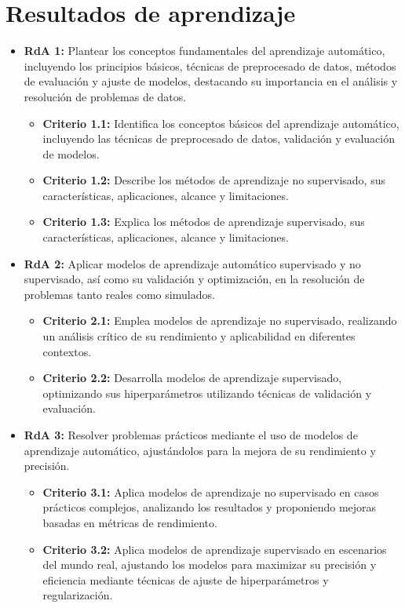 \documentclass[a4,11pt]{aleph-notas}
\begin{document}
\addtolength{\headheight}{1.8\baselineskip}
\addtolength{\voffset}{-1.5\baselineskip}

\encabezado

\section{Resultados de aprendizaje}

\begin{itemize}[leftmargin=*]
\item
    \textbf{RdA 1:} Plantear los conceptos fundamentales del aprendizaje automático, incluyendo los principios básicos, técnicas de preprocesado de datos, métodos de evaluación y ajuste de modelos, destacando su importancia en el análisis y resolución de problemas de datos.
    \begin{itemize}[leftmargin=*]
        \item \textbf{Criterio 1.1:} Identifica los conceptos básicos del aprendizaje automático, incluyendo las técnicas de preprocesado de datos, validación y evaluación de modelos.
        \item \textbf{Criterio 1.2:} Describe los métodos de aprendizaje no supervisado, sus características, aplicaciones, alcance y limitaciones.
        \item \textbf{Criterio 1.3:} Explica los métodos de aprendizaje supervisado, sus características, aplicaciones, alcance y limitaciones.
    \end{itemize}
\item
    \textbf{RdA 2:} Aplicar modelos de aprendizaje automático supervisado y no supervisado, así como su validación y optimización, en la resolución de problemas tanto reales como simulados.
    \begin{itemize}[leftmargin=*]
        \item \textbf{Criterio 2.1:} Emplea modelos de aprendizaje no supervisado, realizando un análisis crítico de su rendimiento y aplicabilidad en diferentes contextos.
        \item \textbf{Criterio 2.2:} Desarrolla modelos de aprendizaje supervisado, optimizando sus hiperparámetros utilizando técnicas de validación y evaluación.
    \end{itemize}
\item
    \textbf{RdA 3:} Resolver problemas prácticos mediante el uso de modelos de aprendizaje automático, ajustándolos para la mejora de su rendimiento y precisión.
    \begin{itemize}[leftmargin=*]
        \item \textbf{Criterio 3.1:} Aplica modelos de aprendizaje no supervisado en casos prácticos complejos, analizando los resultados y proponiendo mejoras basadas en métricas de rendimiento.
        \item \textbf{Criterio 3.2:} Aplica modelos de aprendizaje supervisado en escenarios del mundo real, ajustando los modelos para maximizar su precisión y eficiencia mediante técnicas de ajuste de hiperparámetros y regularización.
    \end{itemize}
\end{itemize}
\end{document}
